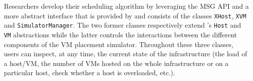 Researchers develop their scheduling algorithm by leveraging the \sg
MSG API and a more abstract interface that is provided by \vmps
and consists of the classes \texttt{XHost}, \texttt{XVM} and
\texttt{SimulatorManager}. The two former classes respectively
extend \sg's \texttt{Host} and \texttt{VM} abstractions while the
latter controls the interactions between the different components of
the VM placement simulator.  Throughout these three classes, users can
inspect, at any time, the current state of the infrastructure (\ie the
load of a host/VM, the number of VMs hosted on the whole
infrastructure or on a particular host, check whether a host is
overloaded, etc.).



